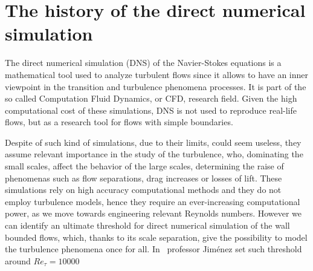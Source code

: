 \section{The history of the direct numerical simulation}
The direct numerical simulation (DNS) of the Navier-Stokes equations is a mathematical tool used to analyze turbulent flows since it allows to have an inner viewpoint in the transition and turbulence phenomena processes. It is part of the so called Computation Fluid Dynamics, or CFD, research field. 
Given the high computational cost of these simulations, DNS is not used to reproduce real-life flows, but as a research tool for flows with simple boundaries\cite{dns:tool}. \par
Despite of such kind of simulations, due to their limits, could seem useless, they assume relevant importance in the study of the turbulence, who, dominating the small scales, affect the behavior of the large scales, determining the raise of phenomenas such as flow separations, drag increases or losses of lift.
These simulations rely on high accuracy computational methods and they do not employ turbulence models, hence they require an ever-increasing computational power, as we move towards engineering relevant Reynolds numbers. 
However we can identify an ultimate threshold for direct numerical simulation of the wall bounded flows, which, thanks to its scale separation,  give the possibility to model the turbulence phenomena once for all. In~\cite{Jimenez2003} professor Jiménez set such threshold around $Re_{\tau}=10000$\\~\par




